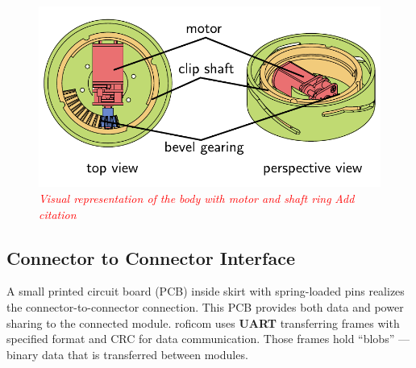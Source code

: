 \documentclass[
  digital,     %
  oneside,     %
  nosansbold,  %
  nocolorbold, %
  lof,         %
  lot,         %
]{fithesis4}
\newcommand{\TODO}[1]{\textcolor{red}{\textit{#1}}}
\begin{document}
\begin{figure}
    \centering
    \includegraphics{ dock_arrangement.pdf }
    \caption{ \TODO{ Visual representation of the body with motor and shaft ring } \TODO{Add citation} }
    \label{ fig:dock-arrangement }
\end{figure}

\subsection{ Connector to Connector Interface }

A small printed circuit board (PCB) inside skirt with spring-loaded pins realizes the connector-to-connector connection. This PCB provides both
data and power sharing to the connected module.
\acrshort{roficom} uses \textbf{UART} transferring frames with specified format and CRC for data communication. Those frames hold ``blobs'' ---
binary data that is transferred between modules. 
\end{document}
